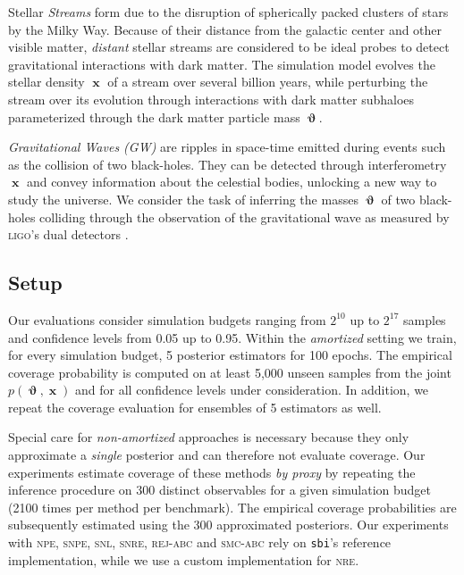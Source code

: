 \documentclass[twoside]{article}
\DeclareMathOperator{\vtheta}{\boldsymbol\vartheta}
\DeclareMathOperator{\vx}{\boldsymbol x}
\begin{document}
Stellar \emph{Streams} form due to the disruption of spherically packed clusters of stars by the Milky Way. Because of their distance from the galactic center and other visible matter, \emph{distant} stellar streams are considered to be ideal probes to detect gravitational interactions with dark matter. The simulation model \citep{bovy2015galpy,banik2018probing,Hermans:2020skz} evolves the stellar density $\vx$ of a stream over several billion years, while perturbing the stream over its evolution through interactions with dark matter subhaloes parameterized through the dark matter particle mass $\vtheta$.

\emph{Gravitational Waves (GW)} are ripples in space-time emitted during events such as the collision of two black-holes. They can be detected through interferometry $\vx$ and convey information about the celestial bodies, unlocking a new way to study the universe. We consider the task of inferring the masses $\vtheta$ of two black-holes colliding through the observation of the gravitational wave as measured by \textsc{ligo}'s dual detectors \citep{lalsuite,Biwer:2018osg}.

\subsection{Setup}
Our evaluations consider simulation budgets ranging from $2^{10}$ up to $2^{17}$ samples and confidence levels from 0.05 up to 0.95. Within the \emph{amortized} setting
we train, for every simulation budget, 5 posterior estimators for 100 epochs. The empirical coverage probability is
computed on at least 5,000 unseen samples from the joint $p(\vtheta,\vx)$ and for all confidence levels under consideration.
In addition, we repeat the coverage evaluation for ensembles of 5 estimators as well.

Special care for \emph{non-amortized} approaches is necessary because they only approximate a \emph{single} posterior and can therefore not evaluate coverage.
Our experiments estimate coverage of these methods \emph{by proxy} by repeating the inference procedure on 300 distinct observables for a given simulation budget (2100 times per method per benchmark).
The empirical coverage probabilities are subsequently estimated using the 300 approximated posteriors.
Our experiments with \textsc{npe}, \textsc{snpe}, \textsc{snl}, \textsc{snre}, \textsc{rej-abc} and \textsc{smc-abc} rely on \texttt{sbi}'s \citep{sbi} reference implementation, while we use a custom implementation for \textsc{nre}.
\end{document}

